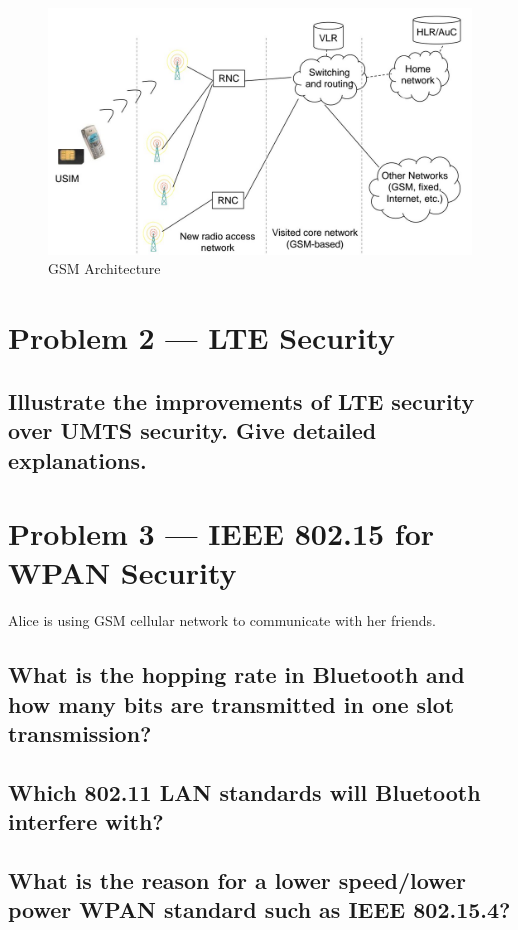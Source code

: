 \documentclass[a4paper]{report}
\begin{document}
\begin{figure}
\begin{mdframed}
\includegraphics[scale=0.2]{UMTS_Architecture1.jpg}
\caption{GSM Architecture}
\label{fig:prob1b}
\end{mdframed}
\end{figure}

\section{Problem 2 --- LTE Security}

\subsection{Illustrate the improvements of LTE security over UMTS security.
            Give detailed explanations.}

\section{Problem 3 --- IEEE 802.15 for WPAN Security}

Alice is using GSM cellular network to communicate with her friends.

\subsection{What is the hopping rate in Bluetooth and how many bits are
            transmitted in one slot transmission?}


\subsection{Which 802.11 LAN standards will Bluetooth interfere with?}


\subsection{What is the reason for a lower speed/lower power WPAN standard
            such as IEEE 802.15.4?}
\end{document}
